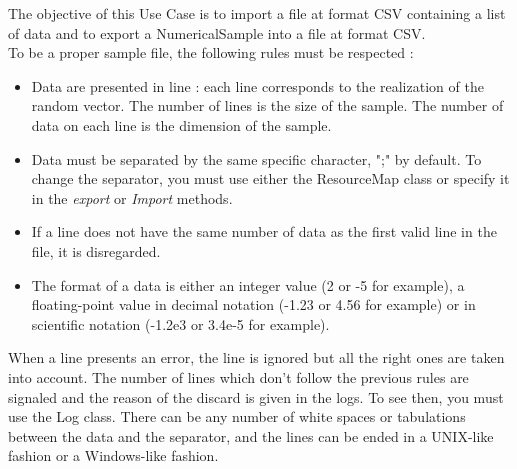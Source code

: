 \renewcommand{\filename}{docUC_InputWithData_CSV.tex}
\renewcommand{\filetitle}{UC : Import / Export data from a file at format CSV (Comma Separated Value)}

\HeaderIIILevel





The objective of this Use Case is to import a file at format CSV containing a list of data and to export a NumericalSample into a file at format CSV. \\


To be a proper sample file, the following rules must be respected :
\begin{itemize}
\item Data are presented in line : each line corresponds to the realization of the random vector. The number of lines is the size of the sample. The number of data on each line is the dimension of the sample.
\item Data must be separated by the same specific character, ";" by default. To change the separator, you must use either the ResourceMap class or specify it in the \emph{export} or \emph{Import} methods.
\item If a line does not have the same number of data as the first valid line in the file, it is disregarded.
\item The format of a data is either an integer value (2 or -5 for example), a floating-point value in decimal notation (-1.23 or 4.56 for example) or in scientific notation (-1.2e3 or 3.4e-5 for example).
\end{itemize}

When a line presents an error, the line is ignored but all the right ones are taken into account. The number of lines which don't follow the previous rules are signaled and the reason of the discard is given in the logs. To see then, you must use the Log class. There can be any number of white spaces or tabulations between the data and the separator, and the lines can be ended in a UNIX-like fashion or a Windows-like fashion.

